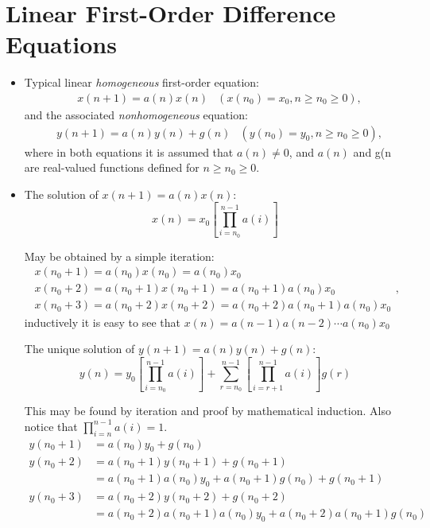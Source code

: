 \section{Linear First-Order Difference Equations}
\begin{itemize}
    \item Typical linear \textit{homogeneous} first-order equation:
        \begin{align*} & x(n+1)=a(n)x(n) & \left(x(n_0)=x_0, n\geq n_0\geq 0\right), \end{align*}
        and the associated \textit{nonhomogeneous} equation:
        \begin{align*} & y(n+1)=a(n)y(n)+g(n) & \left(y(n_0)=y_0, n\geq n_0\geq 0\right), \end{align*}
        where in both equations it is assumed that $a(n)\neq 0$, and $a(n)$ and g(n are real-valued functions defined for $n\geq n_0\geq 0$.
    \item The solution of $x(n+1)=a(n)x(n)$:
        \[x(n)=x_0\left[\prod_{i=n_0}^{n-1} a(i)\right]\]
        \begin{explanation}
            May be obtained by a simple iteration:
            \[
            \begin{array}{l}
                x(n_0+1)=a(n_0)x(n_0)=a(n_0)x_0 \\
                x(n_0+2)=a(n_0+1)x(n_0+1)=a(n_0+1)a(n_0)x_0 \\
                x(n_0+3)=a(n_0+2)x(n_0+2)=a(n_0+2)a(n_0+1)a(n_0)x_0
            \end{array},
        \]
        inductively it is easy to see that $x(n)=a(n-1)a(n-2)\cdots a(n_0)x_0$
        \end{explanation}
        The unique solution of $y(n+1)=a(n)y(n)+g(n)$:
        \[y(n)=y_0\left[\prod_{i=n_0}^{n-1} a(i)\right]+\sum_{r=n_0}^{n-1}\left[\prod_{i=r+1}^{n-1} a(i)\right]g(r)\]
        \begin{explanation}
            This may be found by iteration and proof by mathematical induction. Also notice that $\prod_{i=n}^{n-1} a(i)=1$.
            \begin{align*}
                y(n_0+1) & =a(n_0)y_0+g(n_0) \\
                y(n_0+2) & =a(n_0+1)y(n_0+1)+g(n_0+1) \\
                         & =a(n_0+1)a(n_0)y_0+a(n_0+1)g(n_0)+g(n_0+1) \\
                y(n_0+3) & =a(n_0+2)y(n_0+2)+g(n_0+2) \\
                         & =a(n_0+2)a(n_0+1)a(n_0)y_0+a(n_0+2)a(n_0+1)g(n_0) \\

\end{align*}
\end{explanation}
\end{itemize}
